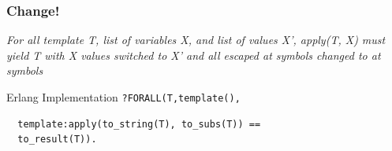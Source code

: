 \documentclass[xcolor=dvipsnames]{beamer}
\begin{document}
\begin{frame}[fragile]
  \frametitle{Change!}

  \begin{center}
    \textit{ For all template T, list of variables X, and list of values X',
      apply(T, X) must yield T with X values switched to X' \alert{and all
        escaped at symbols changed to at symbols}}
  \end{center}

  \begin{block}{Erlang Implementation}
\verb+?FORALL(T,+\alert{\texttt{template(),}}
\begin{verbatim}
  template:apply(to_string(T), to_subs(T)) ==
  to_result(T)).
\end{verbatim}
  \end{block}
\end{frame}
\end{document}
